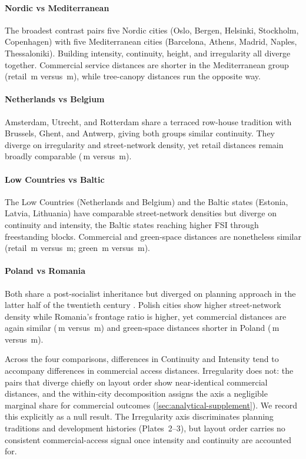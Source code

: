 \documentclass[review,authoryear]{elsarticle}
\begin{document}
\paragraph{Nordic vs Mediterranean}
The broadest contrast pairs five Nordic cities (Oslo, Bergen, Helsinki, Stockholm, Copenhagen) with five Mediterranean cities (Barcelona, Athens, Madrid, Naples, Thessaloniki). Building intensity, continuity, height, and irregularity all diverge together. Commercial service distances are shorter in the Mediterranean group (retail \compMedRetail\,m versus \compNordicRetail\,m), while tree-canopy distances run the opposite way.

\paragraph{Netherlands vs Belgium}
Amsterdam, Utrecht, and Rotterdam share a terraced row-house tradition with Brussels, Ghent, and Antwerp, giving both groups similar continuity. They diverge on irregularity and street-network density, yet retail distances remain broadly comparable (\compNLRetail\,m versus \compBERetail\,m).

\paragraph{Low Countries vs Baltic}
The Low Countries (Netherlands and Belgium) and the Baltic states (Estonia, Latvia, Lithuania) have comparable street-network densities but diverge on continuity and intensity, the Baltic states reaching higher FSI through freestanding blocks. Commercial and green-space distances are nonetheless similar (retail \compLCRetail\,m versus \compBalticRetail\,m; green \compLCGreen\,m versus \compBalticGreen\,m).

\paragraph{Poland vs Romania}
Both share a post-socialist inheritance but diverged on planning approach in the latter half of the twentieth century \citep{stanilov2007post, tsenkova2006urban}. Polish cities show higher street-network density while Romania's frontage ratio is higher, yet commercial distances are again similar (\compPLRetail\,m versus \compRORetail\,m) and green-space distances shorter in Poland (\compPLGreen\,m versus \compROGreen\,m).

Across the four comparisons, differences in Continuity and Intensity tend to accompany differences in commercial access distances. Irregularity does not: the pairs that diverge chiefly on layout order show near-identical commercial distances, and the within-city decomposition assigns the axis a negligible marginal share for commercial outcomes (\ref{sec:analytical-supplement}). We record this explicitly as a null result. The Irregularity axis discriminates planning traditions and development histories (Plates~2--3), but layout order carries no consistent commercial-access signal once intensity and continuity are accounted for.
\end{document}
